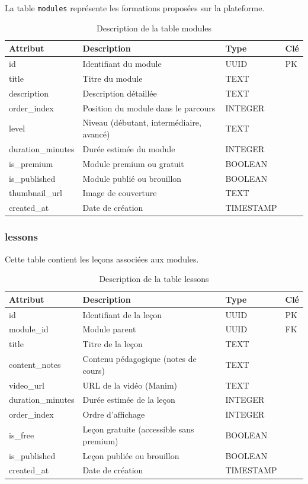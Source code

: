 \documentclass[12pt, a4paper]{report}
\begin{document}
La table \texttt{modules} représente les formations proposées sur la plateforme.

\begin{table}[H]
\centering
\caption{Description de la table modules}
\begin{tabularx}{\textwidth}{|p{3cm}|X|p{2.5cm}|p{1.5cm}|}
\hline
Attribut & Description & Type & Clé \\
\hline
id & Identifiant du module & UUID & PK \\
title & Titre du module & TEXT & \\
description & Description détaillée & TEXT & \\
order\_index & Position du module dans le parcours & INTEGER & \\
level & Niveau (débutant, intermédiaire, avancé) & TEXT & \\
duration\_minutes & Durée estimée du module & INTEGER & \\
is\_premium & Module premium ou gratuit & BOOLEAN & \\
is\_published & Module publié ou brouillon & BOOLEAN & \\
thumbnail\_url & Image de couverture & TEXT & \\
created\_at & Date de création & TIMESTAMP & \\
\hline
\end{tabularx}
\end{table}

\subsubsection{lessons}

Cette table contient les leçons associées aux modules.

\begin{table}[H]
\centering
\caption{Description de la table lessons}
\begin{tabularx}{\textwidth}{|p{3cm}|X|p{2.5cm}|p{1.5cm}|}
\hline
Attribut & Description & Type & Clé \\
\hline
id & Identifiant de la leçon & UUID & PK \\
module\_id & Module parent & UUID & FK \\
title & Titre de la leçon & TEXT & \\
content\_notes & Contenu pédagogique (notes de cours) & TEXT & \\
video\_url & URL de la vidéo (Manim) & TEXT & \\
duration\_minutes & Durée estimée de la leçon & INTEGER & \\
order\_index & Ordre d'affichage & INTEGER & \\
is\_free & Leçon gratuite (accessible sans premium) & BOOLEAN & \\
is\_published & Leçon publiée ou brouillon & BOOLEAN & \\
created\_at & Date de création & TIMESTAMP & \\
\hline
\end{tabularx}
\end{table}
\end{document}
